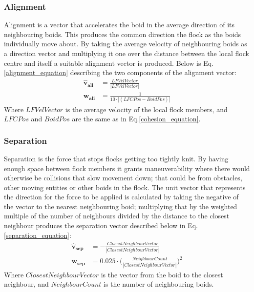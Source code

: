 \subsubsection{Alignment}
Alignment is a vector that accelerates the boid in the average direction of its neighbouring boids. This produces the common direction the flock as the boids individually move about. By taking the average velocity of neighbouring boids as a direction vector and multiplying it one over the distance between the local flock centre and itself a suitable alignment vector is produced. Below is Eq.\ref{alignment_equation} describing the two components of the alignment vector:
\begin{equation}
\begin{split}
	\boldsymbol{\hat{v}_{ali}} &= \frac{ LFVelVector} {|LFVelVector|} \\
	\boldsymbol{w_{ali}} &= \frac{1} {10 \cdot |(LFCPos - BoidPos)|}
\end{split}
\label{alignment_equation}
\end{equation}
Where $LFVelVector$ is the average velocity of the local flock members, and $LFCPos$ and $BoidPos$ are the same as in Eq.\ref{cohesion_equation}.

\subsubsection{Separation}
Separation is the force that stops flocks getting too tightly knit. By having enough space between flock members it grants maneuverability where there would otherwise be collisions that slow movement down; that could be from obstacles, other moving entities or other boids in the flock. The unit vector that represents the direction for the force to be applied is calculated by taking the negative of the vector to the nearest neighbouring boid; multiplying that by the weighted multiple of the number of neighbours divided by the distance to the closest neighbour produces the separation vector described below in Eq.\ref{separation_equation}:
\begin{equation}
\begin{split}
	\boldsymbol{\hat{v}_{sep}} &= -\frac{ClosestNeighbourVector} {| ClosestNeighbourVector|} \\
	\boldsymbol{w_{sep}} &= 0.025 \cdot  \Big(\frac{NeighbourCount} {|ClosestNeighbourVector|}\Big)^2
\end{split}
\label{separation_equation}
\end{equation}
Where $ClosestNeighbourVector$ is the vector from the boid to the closest neighbour, and $NeighbourCount$ is the number of neighbouring boids.

